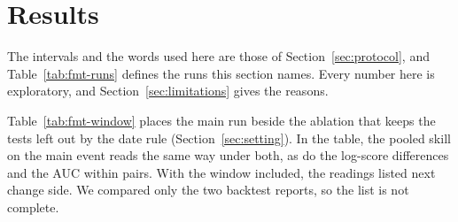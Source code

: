 \section{Results}
\label{sec:results}
The intervals and the words used here are those of Section~\ref{sec:protocol}, and Table~\ref{tab:fmt-runs} defines the runs this section names. Every number here is exploratory, and Section~\ref{sec:limitations} gives the reasons.


\label{sec:window-compare}
Table~\ref{tab:fmt-window} places the main run beside the ablation that keeps the tests left out by the date rule (Section~\ref{sec:setting}). In the table, the pooled skill on the main event reads the same way under both, as do the log-score differences and the AUC within pairs. With the window included, the readings listed next change side. We compared only the two backtest reports, so the list is not complete.
